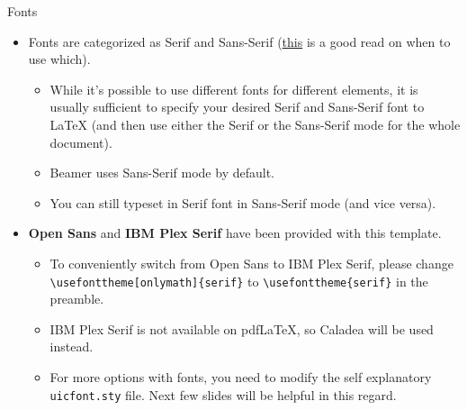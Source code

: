 \documentclass{beamer}
\newcommand{\hrefcol}[2]{\textcolor{uihteal}{\href{#1}{#2}}}
\begin{document}


\begin{frame}[fragile]{Fonts}
\begin{itemize}
\item Fonts are categorized as \textrm{Serif} and \textsf{Sans-Serif} (\hrefcol{https://www.adobe.com/creativecloud/design/discover/serif-vs-sans-serif.html}{this} is a good read on when to use which).
    \begin{itemize}
    \item While it's possible to use different fonts for different elements, it is usually sufficient to specify your desired \textrm{Serif} and \textsf{Sans-Serif} font to LaTeX (and then use either the \textrm{Serif} or the \textsf{Sans-Serif} mode for the whole document).
    \item Beamer uses \textsf{Sans-Serif} mode by default.
    \item \textrm{You can still typeset in Serif font in Sans-Serif mode (and vice versa).}
    \end{itemize}
\item \textbf{\textsf{Open Sans}} and \textbf{\textrm{IBM Plex Serif}} have been provided with this template.
    \begin{itemize}
    \item To conveniently switch from Open Sans to IBM Plex Serif, please change \verb|\usefonttheme[onlymath]{serif}| to \verb|\usefonttheme{serif}| in the preamble.
    \item IBM Plex Serif is not available on pdfLaTeX, so Caladea will be used instead.
    \item For more options with fonts, you need to modify the self explanatory \verb|uicfont.sty| file. Next few slides will be helpful in this regard.
    \end{itemize}
\end{itemize}
\end{frame}
\end{document}
